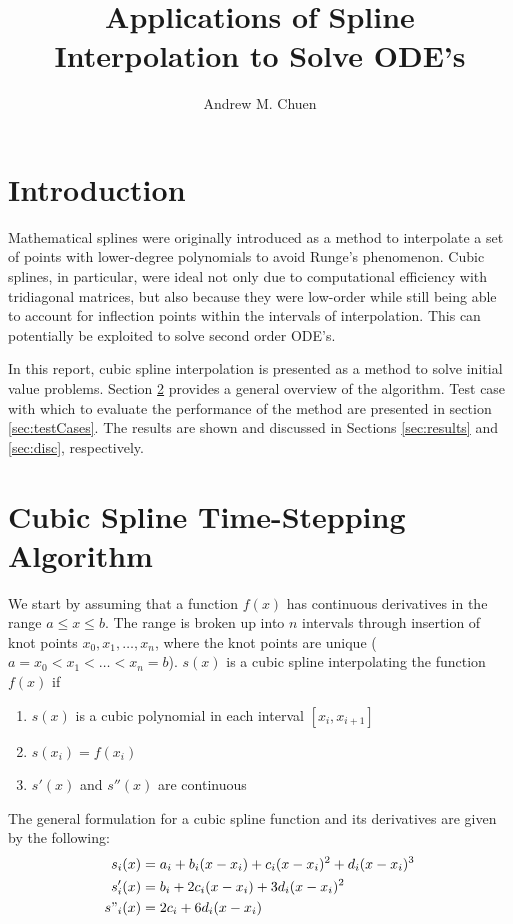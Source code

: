 \documentclass{article}
\title{Applications of Spline Interpolation to Solve ODE's}
\author{Andrew M. Chuen
}
\begin{document}
\maketitle
\section{Introduction}

Mathematical splines were originally introduced as a method to interpolate a set of points with lower-degree polynomials to avoid Runge's phenomenon. Cubic splines, in particular, were ideal not only due to computational efficiency with tridiagonal matrices, but also because they were low-order while still being able to account for inflection points within the intervals of interpolation. This can potentially be exploited to solve second order ODE's.

In this report, cubic spline interpolation is presented as a method to solve initial value problems. Section \ref{sec:algorithm} provides a general overview of the algorithm. Test case with which to evaluate the performance of the method are presented in section \ref{sec:testCases}. The results are shown and discussed in Sections \ref{sec:results} and \ref{sec:disc}, respectively.

\section{Cubic Spline Time-Stepping Algorithm}\label{sec:algorithm}

We start by assuming that a function $f(x)$ has continuous derivatives in the range $a\leq x \leq b$. The range is broken up into $n$ intervals through insertion of knot points $x_0, x_1,\dots,x_n$, where the knot points are unique ($a = x_0 < x_1 < \dots<x_n = b$). $s(x)$ is a cubic spline interpolating the function $f(x)$ if
\begin{enumerate}
	\item $s(x)$ is a cubic polynomial in each interval $\left[x_i, x_{i+1}\right]$
	\item $s(x_i) = f(x_i)$
	\item $s'(x)$ and $s''(x)$ are continuous
\end{enumerate}

The general formulation for a cubic spline function and its derivatives are given by the following:
\begin{align}
s_i(x) &= a_i + b_i(x-x_i)+c_i(x-x_i)^2 + d_i(x-x_i)^3\label{eqn:spline}\\
s'_i(x) &= b_i+2c_i(x-x_i) + 3d_i(x-x_i)^2\label{eqn:deriv}\\
s"_i(x) &= 2c_i + 6d_i(x-x_i)\label{eqn:deriv2}
\end{align}
\end{document}
